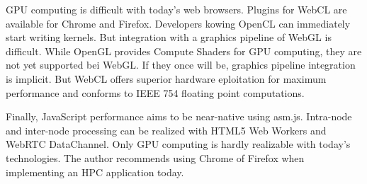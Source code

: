 GPU computing is difficult with today's web browsers. Plugins for WebCL are available for Chrome and Firefox. Developers kowing OpenCL can immediately start writing kernels. But integration with a graphics pipeline of WebGL is difficult. While OpenGL provides Compute Shaders for GPU computing, they are not yet supported bei WebGL. If they once will be, graphics pipeline integration is implicit. But WebCL offers superior hardware eploitation for maximum performance and conforms to IEEE 754 floating point computations.

Finally, JavaScript performance aims to be near-native using asm.js. Intra-node and inter-node processing can be realized with HTML5 Web Workers and WebRTC DataChannel. Only GPU computing is hardly realizable with today's technologies. The author recommends using Chrome of Firefox when implementing an HPC application today.
